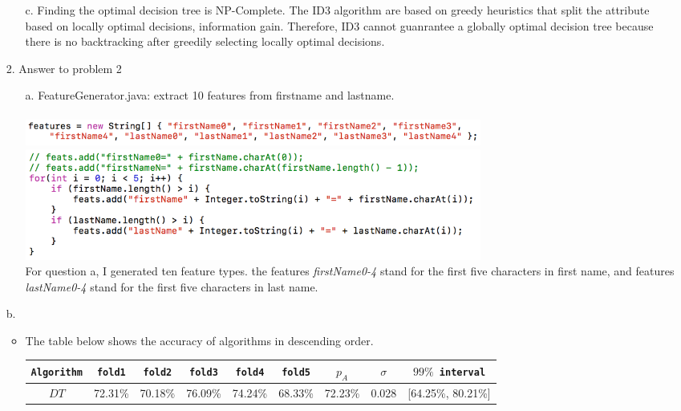 \begin{enumerate}
\begin{enumerate}
\begin{verbatim}
		\end{verbatim}
	\item[c.] Finding the optimal decision tree is NP-Complete. The ID3 algorithm are based on greedy heuristics that split the attribute based on locally optimal decisions, information gain. Therefore, ID3 cannot guanrantee a globally optimal decision tree because there is no backtracking after greedily selecting locally optimal decisions.\\
	\end{enumerate}
\item[2.] Answer to problem 2
	\begin{enumerate}
	\item[a.] FeatureGenerator.java: extract 10 features from firstname and lastname.\\ \\
		\includegraphics[width=15cm]{Picture1} \\
		\includegraphics[width=15cm]{Picture2} \\
		For question a, I generated ten feature types. the features \textit{firstName0-4} stand for the first five characters in first name, and features \textit{lastName0-4} stand for the first five characters in last name. 
	\end{enumerate}
	\item[b.] 
		\begin{itemize}
		\item The table below shows the accuracy of algorithms in descending order.\\
			\begin{table}[h]
				\centering
				\begin{tabular}[h]{|c|c|c|c|c|c|c|c|c|}
					\hline
					\texttt{Algorithm} & \texttt{fold1} & \texttt{fold2} & \texttt{fold3} & \texttt{fold4} & \texttt{fold5} & \texttt{$p_A$} & \texttt{$\sigma$} & \texttt{$99\%$ interval} \\
					\hline
					$DT$      & 72.31\%    & 70.18\%    & 76.09\%    & 74.24\%    & 68.33\%    & 72.23\%    & 0.028    & [64.25\%, 80.21\%]\\

\end{tabular}
\end{table}
\end{itemize}
\end{enumerate}
